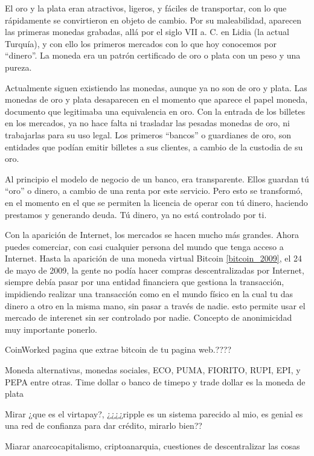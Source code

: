 El oro y la plata eran atractivos, ligeros, y fáciles de transportar, con lo que rápidamente se convirtieron en objeto de cambio. Por su maleabilidad, aparecen las primeras monedas grabadas, allá por el siglo VII a. C. en Lidia (la actual Turquía), y con ello los primeros mercados con lo que hoy conocemos por ``dinero''. La moneda era un patrón certificado de oro o plata con un peso y una pureza. 

Actualmente siguen existiendo las monedas, aunque ya no son de oro y plata. Las monedas de oro y plata desaparecen en el momento que aparece el papel moneda, documento que legitimaba una equivalencia en oro. Con la entrada de los billetes en los mercados, ya no hace falta ni trasladar las pesadas monedas de oro, ni trabajarlas para su uso legal. Los primeros ``bancos'' o guardianes de oro, son entidades que podían emitir billetes a sus clientes, a cambio de la custodia de su oro.

Al principio el modelo de negocio de un banco, era transparente. Ellos guardan tú ``oro'' o dinero, a cambio de una renta por este servicio. Pero esto se transformó, en el momento en el que se permiten la licencia de operar con tú dinero, haciendo prestamos y generando deuda. Tú dinero, ya no está controlado por ti.
 
Con la aparición de Internet, los mercados se hacen mucho más grandes. Ahora puedes comerciar, con casi cualquier persona del mundo que tenga acceso a Internet. Hasta la aparición de una moneda virtual Bitcoin \ref{bitcoin_2009}, el 24 de mayo de 2009, la gente no podía hacer compras descentralizadas por Internet, siempre debía pasar por una entidad financiera que gestiona la transacción, impidiendo realizar una transacción como en el mundo físico en la cual tu das dinero a otro en la misma mano, sin pasar a través de nadie. esto permite usar el mercado de interenet sin ser controlado por nadie. Concepto de anonimicidad muy importante ponerlo.

CoinWorked pagina que extrae bitcoin de tu pagina web.????

Moneda alternativas, monedas sociales, ECO, PUMA, FIORITO, RUPI, EPI, y PEPA entre otras. Time dollar o banco de timepo y trade dollar es la moneda de plata

Mirar ¿que es el virtapay?, ¿¿¿¿ripple es un sistema parecido al mio, es genial es una red de confianza para dar crédito, mirarlo bien??

Miarar anarcocapitalismo, criptoanarquia, cuestiones de descentralizar las cosas

